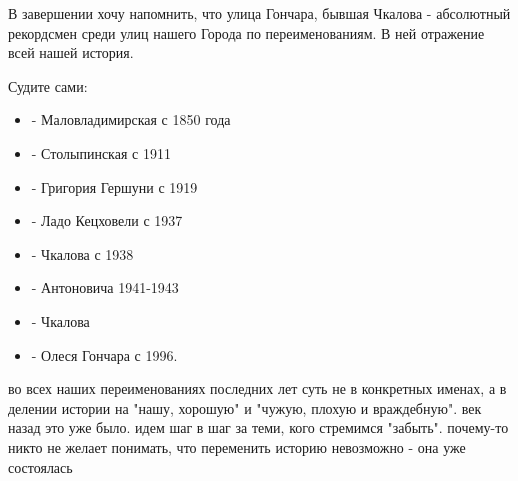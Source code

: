 В завершении хочу напомнить, что улица Гончара, бывшая Чкалова - абсолютный
рекордсмен среди улиц нашего Города по переименованиям. В ней отражение всей
нашей история. 

Судите сами: 

\begin{itemize}
  \item - Маловладимирская с 1850 года 
  \item - Столыпинская с 1911
  \item - Григория Гершуни с 1919
  \item - Ладо Кецховели с 1937 
  \item - Чкалова с 1938 
  \item - Антоновича 1941-1943
  \item - Чкалова 
  \item - Олеся Гончара с 1996.
\end{itemize}

\begin{cmtfront}

во всех наших переименованиях последних лет суть не в конкретных именах, а в
делении истории на "нашу, хорошую" и "чужую, плохую и враждебную". век назад
это уже было. идем шаг в шаг за теми, кого стремимся "забыть". почему-то никто
не желает понимать, что переменить историю невозможно - она уже состоялась
	
\end{cmtfront}

